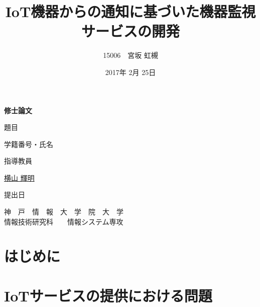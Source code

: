 \documentclass[a4paper]{jreport}
\begin{document}
\makeatletter
\renewcommand{\bibname}{参考文献}

\title{IoT機器からの通知に基づいた機器監視サービスの開発}
\author{15006　宮坂 虹槻}
\date{2017年 2月 25日}
\def\@teacher{横山 輝明}

\begin{titlepage}\begin{center}
{\Huge \textbf{修士論文} \par}
\vspace{1.5cm}
{\LARGE\gt 題目 \par}
{\LARGE\gt \underline{\@title} \par}
\vspace{2.5cm}
{\LARGE\gt 学籍番号・氏名 \par}
\vspace{1.5cm}
{\LARGE \underline{\@author} \par}
\vspace{1.5cm}
{\LARGE\gt 指導教員 \par}
\vspace{1.5cm}
{\LARGE\gt \underline{\@teacher} \par}
\vspace{1.5cm}
{\LARGE\gt 提出日 \par}
\vspace{1.5cm}
{\LARGE\gt \underline{\@date} \par}
\vspace{1.5cm}
{\Large\gt
神　戸　情　報　大　学　院　大　学\\
情報技術研究科　　情報システム専攻\\
\par}
\end{center}\end{titlepage}
\restoregeometry
\makeatother

\tableofcontents
\listoffigures
\listoftables

\begin{abstract}

\end{abstract}

\chapter{はじめに}

\chapter{IoTサービスの提供における問題}

\end{document}
